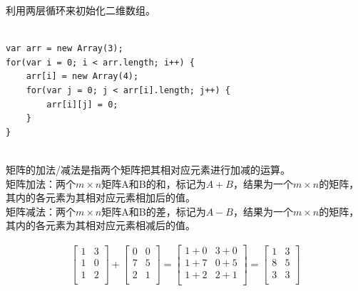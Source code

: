 利用两层循环来初始化二维数组。 \\

 \\

\begin{lstlisting}[style=htmlcssjs]
var arr = new Array(3);
for(var i = 0; i < arr.length; i++) {
    arr[i] = new Array(4);
    for(var j = 0; j < arr[i].length; j++) {
        arr[i][j] = 0;
    }
}
\end{lstlisting}

 \\

矩阵的加法/减法是指两个矩阵把其相对应元素进行加减的运算。 \\

矩阵加法：两个$ m \times n $矩阵A和B的和，标记为$ A + B $，结果为一个$ m \times n $的矩阵，其内的各元素为其相对应元素相加后的值。 \\

矩阵减法：两个$ m \times n $矩阵A和B的差，标记为$ A - B $，结果为一个$ m \times n $的矩阵，其内的各元素为其相对应元素相减后的值。

\begin{align}\nonumber
	\left[\begin{matrix}
			1 & 3 \\
			1 & 0 \\
			1 & 2 \\
		\end{matrix} \right]
	+
	\left[\begin{matrix}
			0 & 0 \\
			7 & 5 \\
			2 & 1 \\
		\end{matrix} \right]
	=
	\left[\begin{matrix}
			1+0 & 3+0 \\
			1+7 & 0+5 \\
			1+2 & 2+1 \\
		\end{matrix} \right]
	=
	\left[\begin{matrix}
			1 & 3 \\
			8 & 5 \\
			3 & 3 \\
		\end{matrix} \right]
\end{align}

